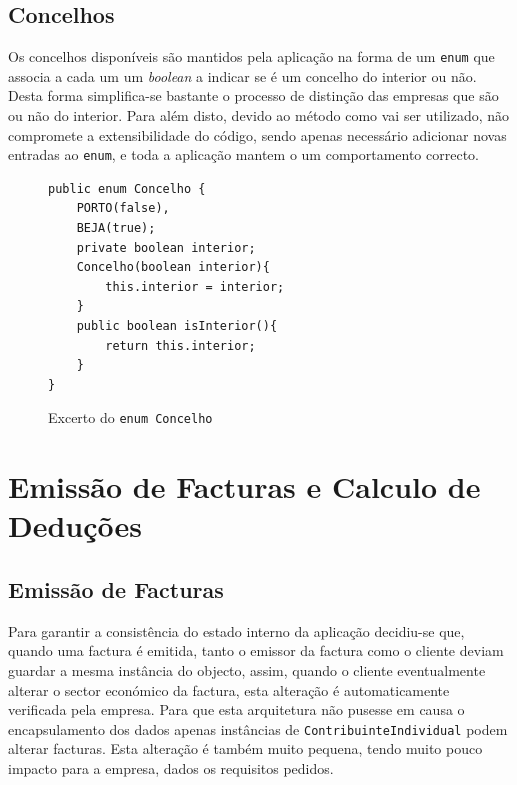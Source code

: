 \documentclass[12pt,a4paper]{report}
\begin{document}
\section{Concelhos}
\label{sec:concelho}
    Os concelhos disponíveis são mantidos pela aplicação na forma de um
    \texttt{enum} que associa a cada um um \textit{boolean} a indicar se
    é um concelho do interior ou não. Desta forma simplifica-se bastante o processo
    de distinção das empresas que são ou não do interior. Para além disto, devido
    ao método como vai ser utilizado, não compromete a extensibilidade do código,
    sendo apenas necessário adicionar novas entradas ao \texttt{enum}, e
    toda a aplicação mantem o um comportamento correcto.

    \begin{figure}[h]
        \begin{verbatim}
public enum Concelho {
    PORTO(false),
    BEJA(true);
    private boolean interior;
    Concelho(boolean interior){
        this.interior = interior;
    }
    public boolean isInterior(){
        return this.interior;
    }
}
        \end{verbatim}
        \caption{Excerto do \texttt{enum Concelho}}
        \label{fig:concelhos}
    \end{figure}

\chapter{Emissão de Facturas e Calculo de Deduções}
\label{chp:emissao}

\section{Emissão de Facturas}
    Para garantir a consistência do estado interno da aplicação decidiu-se que,
    quando uma factura é emitida, tanto o emissor da factura como o cliente
    deviam guardar a mesma instância do objecto, assim, quando o cliente
    eventualmente alterar o sector económico da factura, esta alteração é
    automaticamente verificada pela empresa. Para que esta arquitetura não
    pusesse em causa o encapsulamento dos dados apenas instâncias de
    \texttt{ContribuinteIndividual} podem alterar facturas. Esta
    alteração é também muito pequena, tendo muito pouco impacto para a empresa,
    dados os requisitos pedidos.
\end{document}

